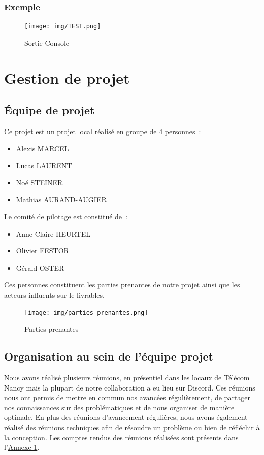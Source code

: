 \documentclass[french,a4paper]{article}
\begin{document}
    \subsubsection{Exemple}

    \begin{center}
        \begin{figure}[H]
            \centering
            \texttt{[image: img/TEST.png]}
            \caption{Sortie Console}
        \end{figure}
    \end{center}

    \section{Gestion de projet}
    \subsection{Équipe de projet}
    Ce projet est un projet local réalisé en groupe de 4 personnes~:
    \begin{itemize}
        \item Alexis MARCEL
        \item Lucas LAURENT
        \item Noé STEINER
        \item Mathias AURAND-AUGIER
    \end{itemize}
    Le comité de pilotage est constitué de~:
    \begin{itemize}
        \item Anne-Claire HEURTEL
        \item Olivier FESTOR
        \item Gérald OSTER
    \end{itemize}
    Ces personnes constituent les parties prenantes de notre projet ainsi que les acteurs influents sur le livrables.
    \begin{figure}[H]
        \centering
        \texttt{[image: img/parties\_prenantes.png]}
        \caption{Parties prenantes}
    \end{figure}
    \subsection{Organisation au sein de l’équipe projet}
    Nous avons réalisé plusieurs réunions, en présentiel dans les locaux de Télécom Nancy mais la plupart de notre collaboration a eu lieu sur Discord. Ces réunions nous ont permis de mettre en commun nos avancées régulièrement, de partager nos connaissances sur des problématiques et de nous organiser de manière optimale.
    En plus des réunions d'avancement régulières, nous avons également réalisé des réunions techniques afin de résoudre un problème ou bien de réfléchir à la conception.
    Les comptes rendus des réunions réalisées sont présents dans l’\hyperlink{annexe1}{Annexe 1}.
\end{document}
